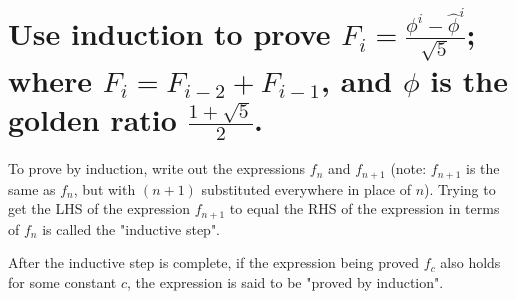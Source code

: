 \section[Problem 2]{Use induction to prove $F_i = \frac{\phi^i - \hat{\phi}^i}{\sqrt{5}}$; where $F_i = F_{i-2} + F_{i-1}$, and $\phi$ is the golden ratio $\frac{1 + \sqrt{5}}{2}$.}

To prove by induction, write out the expressions $f_n$ and $f_{n + 1}$ (note: $f_{n + 1}$ is the same as $f_n$, but with $(n + 1)$ substituted everywhere in place of $n$). Trying to get the LHS of the expression $f_{n + 1}$ to equal the RHS of the expression in terms of $f_n$ is called the "inductive step". 

After the inductive step is complete, if the expression being proved $f_c$ also holds for some constant $c$, the expression is said to be "proved by induction".

